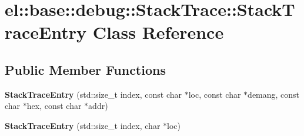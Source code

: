 \hypertarget{classel_1_1base_1_1debug_1_1StackTrace_1_1StackTraceEntry}{\section{el\-:\-:base\-:\-:debug\-:\-:Stack\-Trace\-:\-:Stack\-Trace\-Entry Class Reference}
\label{classel_1_1base_1_1debug_1_1StackTrace_1_1StackTraceEntry}
}
\subsection*{Public Member Functions}
\begin{DoxyCompactItemize}
\item 
\hypertarget{classel_1_1base_1_1debug_1_1StackTrace_1_1StackTraceEntry_a49b21719794ee5de7f70e2558ebcba9e}{{\bfseries Stack\-Trace\-Entry} (std\-::size\-\_\-t index, const char $\ast$loc, const char $\ast$demang, const char $\ast$hex, const char $\ast$addr)}\label{classel_1_1base_1_1debug_1_1StackTrace_1_1StackTraceEntry_a49b21719794ee5de7f70e2558ebcba9e}

\item 
\hypertarget{classel_1_1base_1_1debug_1_1StackTrace_1_1StackTraceEntry_a9fbf0675fe713b1ac4ec692bbe661afe}{{\bfseries Stack\-Trace\-Entry} (std\-::size\-\_\-t index, char $\ast$loc)}\label{classel_1_1base_1_1debug_1_1StackTrace_1_1StackTraceEntry_a9fbf0675fe713b1ac4ec692bbe661afe}

\end{DoxyCompactItemize}
